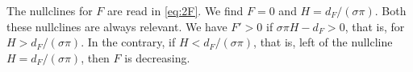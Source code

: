 \documentclass[12pt]{article}
\theoremstyle{plain}
\begin{document}
The nullclines for $F$ are read in \eqref{eq:2F}. We find $F=0$ and $H=d_F/(\sigma\pi)$. Both these nullclines are always relevant. We have $F'>0$ if $\sigma\pi H-d_F>0$, that is, for $H>d_F/(\sigma\pi)$. In the contrary, if $H<d_F/(\sigma\pi)$, that is, left of the nullcline $H=d_F/(\sigma\pi)$, then $F$ is decreasing.

\end{document}
